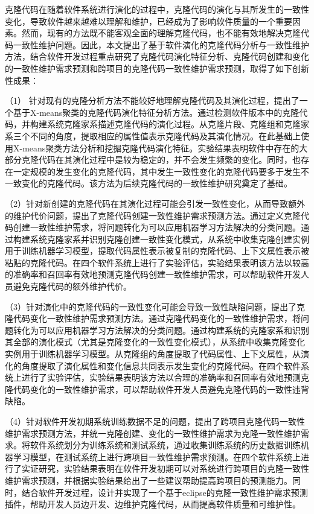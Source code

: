 

克隆代码在随着软件系统进行演化的过程中，克隆代码的演化与其所发生的一致性变化，导致软件越来越难以理解和维护，已经成为了影响软件质量的一个重要因素。然而，现有的方法既不能客观全面的理解克隆代码，也不能有效地解决克隆代码一致性维护问题。因此，本文提出了基于软件演化的克隆代码分析与一致性维护方法，结合软件开发过程重点研究了克隆代码演化特征分析、克隆代码创建和变化的一致性维护需求预测和跨项目的克隆代码一致性维护需求预测，取得了如下创新性成果：

（1） 针对现有的克隆分析方法不能较好地理解克隆代码及其演化过程，提出了一个基于X-means聚类的克隆代码演化特征分析方法。通过检测软件版本中的克隆代码，并构建系统克隆家系描述克隆代码的演化过程。从克隆片段、克隆组和克隆家系三个不同的角度，提取相应的属性值表示克隆代码及其演化情况。在此基础上使用X-means聚类方法分析和挖掘克隆代码演化特征。实验结果表明软件中存在的大部分克隆代码在其演化过程中是较为稳定的，并不会发生频繁的变化。同时，也存在一定规模的发生变化的克隆代码，其中发生一致性变化的克隆代码要多于发生不一致变化的克隆代码。该方法为后续克隆代码的一致性维护研究奠定了基础。

（2）针对新创建的克隆代码在其演化过程可能会引发一致性变化，从而导致额外的维护代价问题，提出了克隆代码创建一致性维护需求预测方法。通过定义克隆代码创建一致性维护需求，将问题转化为可以应用机器学习方法解决的分类问题。通过构建系统克隆家系并识别克隆创建一致性变化模式，从系统中收集克隆创建实例用于训练机器学习模型，提取代码属性表示被复制的克隆代码、上下文属性表示被粘贴的克隆代码。在四个软件系统上进行了实验评估，实验结果表明该方法以较高的准确率和召回率有效地预测克隆代码创建一致性维护需求，可以帮助软件开发人员避免克隆代码的额外维护代价。

（3）针对演化中的克隆代码的一致性变化可能会导致一致性缺陷问题，提出了克隆代码变化一致性维护需求预测方法。通过克隆代码变化的一致性维护需求，将问题转化为可以应用机器学习方法解决的分类问题。通过构建系统的克隆家系和识别其全部的演化模式（尤其是克隆变化的一致性变化模式），从系统中收集克隆变化实例用于训练机器学习模型。从克隆组的角度提取了代码属性、上下文属性，从演化的角度提取了演化属性和变化信息共同表示发生变化的克隆代码。在四个软件系统上进行了实验评估，实验结果表明该方法以合理的准确率和召回率有效地预测克隆代码变化的一致性维护需求，可以帮助软件开发人员避免克隆代码的一致性违背缺陷。

（4）针对软件开发初期系统训练数据不足的问题，提出了跨项目克隆代码一致性维护需求预测方法，并统一克隆创建、变化的一致性维护需求为克隆一致性维护需求。将软件系统划分为训练系统和测试系统，通过收集训练系统的历史数据训练机器学习模型，在测试系统上进行跨项目一致性维护需求预测。在四个软件系统上进行了实证研究，实验结果表明在软件开发初期可以对系统进行跨项目的克隆一致性维护需求预测，并根据实验结果给出了一些建议帮助提高跨项目的预测能力。同时，结合软件开发过程，设计并实现了一个基于eclipse的克隆一致性维护需求预测插件，帮助开发人员边开发、边维护克隆代码，从而提高软件质量和可维护性。

